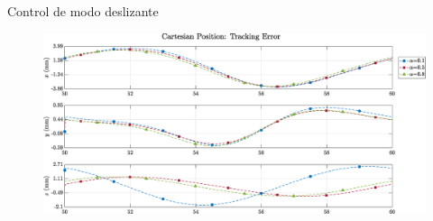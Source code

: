 \documentclass[10pt]{beamer} %
\begin{document}
	\begin{frame}[fragile]{Control de modo deslizante}
		\begin{figure}
			\centering
			\hspace*{-0.5cm}\includegraphics[width=1.1\textwidth]{img/SMCi/circular_traj/60_seg/articular_SMCi_pos_xyz_error_compare.eps}
		\end{figure}
	\end{frame}

	


	
	
\end{document}
